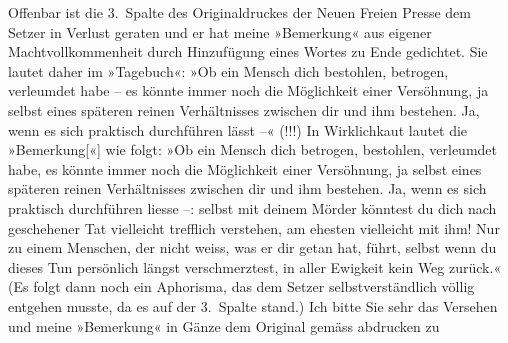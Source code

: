 \begin{ledgroupsized}[t]{13cm}
               Offenbar ist die 3. Spalte des Originaldruckes der Neuen Freien Presse
               dem Setzer in Verlust geraten und er hat meine »Bemerkung« aus eigener
               Machtvollkommenheit durch Hinzufügung eines Wortes zu Ende gedichtet. Sie lautet
               daher im »Tagebuch«: »Ob ein Mensch dich
               bestohlen, betrogen, verleumdet habe – es könnte immer noch die Möglichkeit einer
               Versöhnung, ja selbst eines späteren reinen Verhältnisses zwischen dir und ihm
               bestehen. Ja, wenn es sich praktisch durchführen lässt –« (!!!)\pend
           \pstart
           In Wirklichkaut lautet die »Bemerkung{[}«{]} wie folgt:\pend
           \pstart
           »Ob ein Mensch dich betrogen, bestohlen, 
               verleumdet habe, es könnte immer noch die Möglichkeit einer Versöhnung, ja selbst
               eines späteren reinen Verhältnisses zwischen dir und ihm bestehen. Ja, wenn es sich
               praktisch durchführen liesse –: selbst mit deinem
               Mörder könntest du dich nach geschehener Tat vielleicht trefflich verstehen, am
               ehesten vielleicht mit ihm! Nur {\pb}zu einem Menschen, der
               nicht weiss, was er dir getan hat, führt, selbst wenn du dieses Tun persönlich längst
               verschmerztest, in aller Ewigkeit kein Weg zurück.«\pend
           \pstart
           (Es folgt dann noch ein Aphorisma, das dem Setzer selbstverständlich völlig entgehen
               musste, da es auf der 3. Spalte stand.)\pend
           \pstart
           Ich bitte Sie sehr das Versehen \label{K_L02476-1v}\label{K_L02476-1h} und meine »Bemerkung« in Gänze dem Original gemäss abdrucken zu

\end{ledgroupsized}

